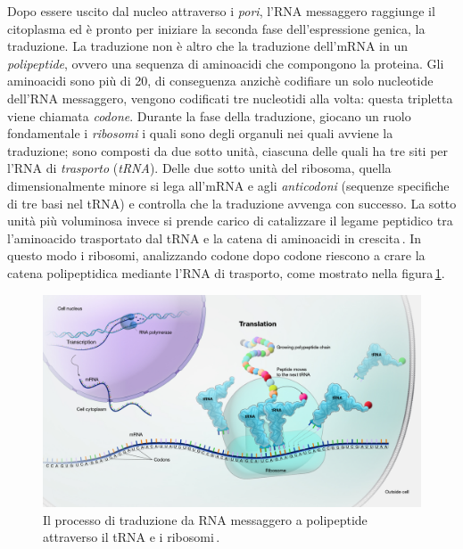 Dopo essere uscito dal nucleo attraverso i \textsl{pori}, l'RNA messaggero raggiunge il citoplasma ed è pronto per iniziare la seconda fase dell'espressione genica, la traduzione. La traduzione non è altro che la traduzione dell'mRNA in un \textsl{polipeptide}, ovvero una sequenza di aminoacidi che compongono la proteina. Gli aminoacidi sono più di 20, di conseguenza anzichè codifiare un solo nucleotide dell'RNA messaggero, vengono codificati tre nucleotidi alla volta: questa tripletta viene chiamata \textsl{codone}. Durante la fase della traduzione, giocano un ruolo fondamentale i \textsl{ribosomi} i quali sono degli organuli nei quali avviene la traduzione; sono composti da due sotto unità, ciascuna delle quali ha tre siti per l'RNA di \textsl{trasporto} (\textsl{tRNA}). Delle due sotto unità del ribosoma, quella dimensionalmente minore si lega all'mRNA e agli \textsl{anticodoni} (sequenze specifiche di tre basi nel tRNA) e controlla che la traduzione avvenga con successo. La sotto unità più voluminosa invece si prende carico di catalizzare il legame peptidico tra l'aminoacido trasportato dal tRNA e la catena di aminoacidi in crescita\,\cite{ramakrishnan2002ribosome, lemonniermarathon, livingstone2010mechanisms}. In questo modo i ribosomi, analizzando codone dopo codone riescono a crare la catena polipeptidica mediante l'RNA di trasporto, come mostrato nella figura\,\ref{fig:mrna-translation}.

\begin{figure}[b!]
    \centering
    \includegraphics[width=\textwidth]{assets/mrna-translation.jpg}
    \caption[Il processo di traduzione da mRNA a polipeptide.]{Il processo di traduzione da RNA messaggero a polipeptide attraverso il tRNA e i ribosomi\,\cite{nhgri_translation_image}.}\label{fig:mrna-translation}
\end{figure}

